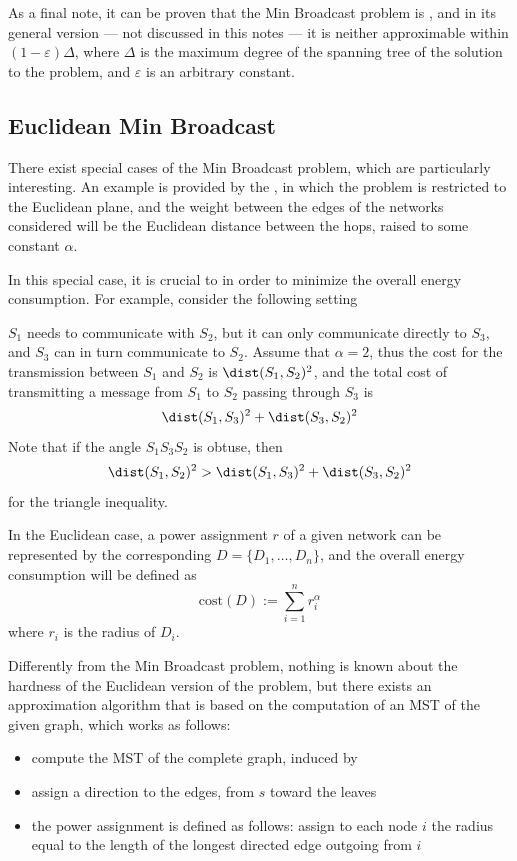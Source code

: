 \documentclass[a4paper, 12pt]{report}
\begin{document}
    As a final note, it can be proven that the Min Broadcast problem is \NPComplete \cite{cagalj}, and in its general version --- not discussed in this notes --- it is neither approximable within $(1 - \varepsilon) \Delta$, where $\Delta$ is the maximum degree of the spanning tree of the solution to the problem, and $\varepsilon$ is an arbitrary constant.

    \subsection{Euclidean Min Broadcast}

    There exist special cases of the Min Broadcast problem, which are particularly interesting. An example is provided by the , in which the problem is restricted to the Euclidean plane, and the weight between the edges of the networks considered will be the Euclidean distance between the hops, raised to some constant $\alpha$.

    In this special case, it is crucial to  in order to minimize the overall energy consumption. For example, consider the following setting


    $S_1$ needs to communicate with $S_2$, but it can only communicate directly to $S_3$, and $S_3$ can in turn communicate to $S_2$. Assume that $\alpha = 2$, thus the cost for the transmission between $S_1$ and $S_2$ is $\dist(S_1, S_2)^2$, and the total cost of transmitting a message from $S_1$ to $S_2$ passing through $S_3$ is $$\dist(S_1, S_3)^2 + \dist(S_3, S_2)^2$$ Note that if the angle $S_1S_3S_2$ is obtuse, then $$\dist(S_1, S_2)^2 > \dist(S_1, S_3)^2 + \dist(S_3, S_2)^2$$ for the triangle inequality.

    In the Euclidean case, a power assignment $r$ of a given network can be represented by the corresponding  $D = \{D_1, \ldots, D_n\}$, and the overall energy consumption will be defined as $$\mathrm{cost}(D) := \sum_{i = 1}^n{r_i^\alpha}$$ where $r_i$ is the radius of $D_i$.

    Differently from the Min Broadcast problem, nothing is known about the hardness of the Euclidean version of the problem, but there exists an approximation algorithm that is based on the computation of an MST of the given graph, which works as follows:

    \begin{itemize}
        \item compute the MST of the complete graph, induced by 
        \item assign a direction to the edges, from $s$ toward the leaves
        \item the power assignment is defined as follows: assign to each node $i$ the radius equal to the length of the longest directed edge outgoing from $i$
    \end{itemize}
\end{document}
